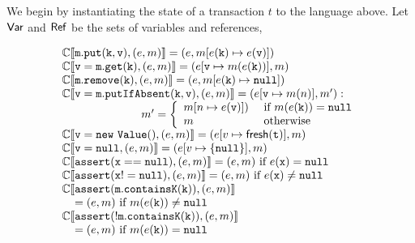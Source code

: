 We begin by instantiating the state of a transaction $t$ to the language above.
%
Let $\mathsf{Var}$ and $\mathsf{Ref}$ be the sets of variables and references, 
\begin{wrapfigure}[15]{r}{0.7\textwidth}
\vspace{-1cm}
  \[
	\begin{array}{l}
	\mathbb{C}\llbracket \mathtt{m.put(k, v)}, (e, m) \rrbracket = 
	(e, m[e(\mathtt{k}) \mapsto e(\mathtt{v})])\\
	\mathbb{C}\llbracket \mathtt{v=m.get(k)}, (e, m) \rrbracket = (e[\mathtt{v} \mapsto m(e(\mathtt{k}))], m) \\
	\mathbb{C}\llbracket \mathtt{m.remove(k)}, (e, m) \rrbracket = 
	(e, m[e(\mathtt{k}) \mapsto \mathtt{null}])\\
	\mathbb{C}\llbracket \mathtt{v = m.putIfAbsent(k, v)}, (e, m) \rrbracket =  (e[\mathtt{v} \mapsto m(n)], m') : \\
	\hspace{70pt} 
	m'=
	\left\{
	\begin{array}{ll}
	m[n \mapsto e(\mathtt{v})]) & \textrm{ if } m(e(\mathtt{k})) = \mathtt{null}\\
	m & \textrm{ otherwise}\\
	\end{array}
	\right. \\
	\mathbb{C}\llbracket \mathtt{v = new\ Value()}, (e, m) \rrbracket =  (e[v \mapsto \mathsf{fresh}(\mathtt{t})], m)\\
	\mathbb{C}\llbracket \mathtt{v = null}, (e, m) \rrbracket =  (e[v \mapsto \{\mathtt{null}\}], m)\\
	\mathbb{C}\llbracket \mathtt{assert(x==null)}, (e, m) \rrbracket = (e,m) \textrm{ if } e(\mathtt{x})=\mathtt{null}\\
	\mathbb{C}\llbracket \mathtt{assert(x!=null)}, (e, m) \rrbracket = (e,m ) \textrm{ if } e(\mathtt{x})\neq\mathtt{null}\\
	\mathbb{C}\llbracket \mathtt{assert(m.containsK(k))}, (e, m) \rrbracket \\
          \;\;\;\; = (e, m) \textrm{ if } m(e(\mathtt{k})) \neq \mathtt{null}\\
	  \mathbb{C}\llbracket \mathtt{assert(!m.containsK(k))}, (e, m) \rrbracket\\
          \;\;\;\;=(e, m) \textrm{ if } m(e(\mathtt{k})) = \mathtt{null}\\
	\end{array}
	\]
\end{wrapfigure}
